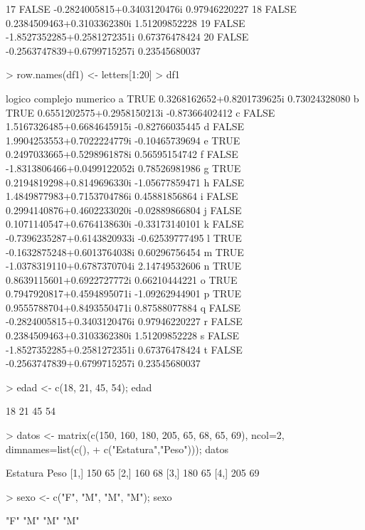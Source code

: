 \documentclass{article}
\begin{document}
\begin{Schunk}
\begin{Soutput}
17  FALSE -0.2824005815+0.3403120476i  0.97946220227
18  FALSE  0.2384509463+0.3103362380i  1.51209852228
19  FALSE -1.8527352285+0.2581272351i  0.67376478424
20  FALSE -0.2563747839+0.6799715257i  0.23545680037
\end{Soutput}
\begin{Sinput}
> row.names(df1) <- letters[1:20]
> df1
\end{Sinput}
\begin{Soutput}
  logico                    complejo       numerico
a   TRUE  0.3268162652+0.8201739625i  0.73024328080
b   TRUE  0.6551202575+0.2958150213i -0.87366402412
c  FALSE  1.5167326485+0.6684645915i -0.82766035445
d  FALSE  1.9904253553+0.7022224779i -0.10465739694
e   TRUE  0.2497033665+0.5298961878i  0.56595154742
f  FALSE -1.8313806466+0.0499122052i  0.78526981986
g   TRUE  0.2194819298+0.8149696330i -1.05677859471
h  FALSE  1.4849877983+0.7153704786i  0.45881856864
i  FALSE  0.2994140876+0.4602233020i -0.02889866804
j  FALSE  0.1071140547+0.6764138630i -0.33173140101
k  FALSE -0.7396235287+0.6143820933i -0.62539777495
l   TRUE -0.1632875248+0.6013764038i  0.60296756454
m   TRUE -1.0378319110+0.6787370704i  2.14749532606
n   TRUE  0.8639115601+0.6922727772i  0.66210444221
o   TRUE  0.7947920817+0.4594895071i -1.09262944901
p   TRUE  0.9555788704+0.8493550471i  0.87588077884
q  FALSE -0.2824005815+0.3403120476i  0.97946220227
r  FALSE  0.2384509463+0.3103362380i  1.51209852228
s  FALSE -1.8527352285+0.2581272351i  0.67376478424
t  FALSE -0.2563747839+0.6799715257i  0.23545680037
\end{Soutput}
\begin{Sinput}
> edad <- c(18, 21, 45, 54); edad
\end{Sinput}
\begin{Soutput}
[1] 18 21 45 54
\end{Soutput}
\begin{Sinput}
> datos <- matrix(c(150, 160, 180, 205, 65, 68, 65, 69), ncol=2, dimnames=list(c(),
+                                                                              c("Estatura","Peso"))); datos
\end{Sinput}
\begin{Soutput}
     Estatura Peso
[1,]      150   65
[2,]      160   68
[3,]      180   65
[4,]      205   69
\end{Soutput}
\begin{Sinput}
> sexo <- c("F", "M", "M", "M"); sexo
\end{Sinput}
\begin{Soutput}
[1] "F" "M" "M" "M"

\end{Soutput}
\end{Schunk}
\end{document}
